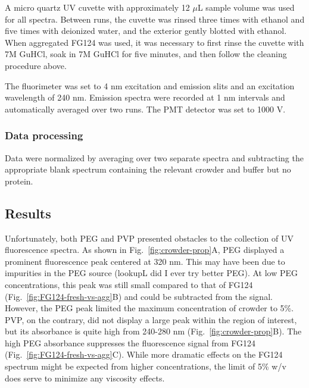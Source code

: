 A micro quartz UV cuvette with approximately 12 $\mu$L sample volume was used for all spectra.  Between runs, the cuvette was rinsed three times with ethanol and five times with deionized water, and the exterior gently blotted with ethanol.  When aggregated FG124 was used, it was necessary to first rinse the cuvette with 7M GuHCl, soak in 7M GuHCl for five minutes, and then follow the cleaning procedure above.

The fluorimeter was set to 4 nm excitation and emission slits and an excitation wavelength of 240 nm.  Emission spectra were recorded at 1 nm intervals and automatically averaged over two runs.  The PMT detector was set to 1000 V.

\subsubsection{Data processing}
Data were normalized by averaging over two separate spectra and subtracting the appropriate blank spectrum containing the relevant crowder and buffer but no protein.

\subsection{Results}
Unfortunately, both PEG and PVP presented obstacles to the collection of UV fluorescence spectra. As shown in Fig.~\ref{fig:crowder-prop}A, PEG displayed a prominent fluorescence peak centered at 320 nm.  This may have been due to impurities in the PEG source (lookupL did I ever try better PEG).  At low PEG concentrations, this peak was still small compared to that of FG124 (Fig.~\ref{fig:FG124-fresh-vs-agg}B) and could be subtracted from the signal.  However, the PEG peak limited the maximum concentration of crowder to 5\%.  PVP, on the contrary, did not display a large peak within the region of interest, but its absorbance is quite high from 240-280 nm (Fig.~\ref{fig:crowder-prop}B).  The high PEG absorbance suppresses the fluorescence signal from FG124 (Fig.~\ref{fig:FG124-fresh-vs-agg}C).  While more dramatic effects on the FG124 spectrum might be expected from higher concentrations, the limit of 5\% w/v does serve to minimize any viscosity effects.

